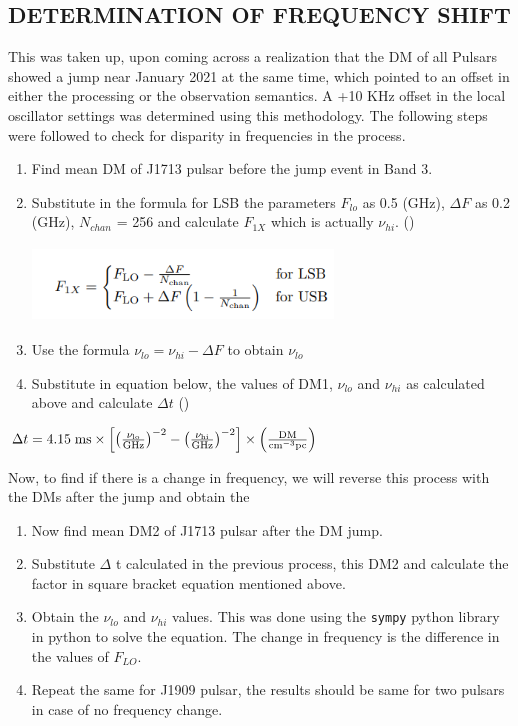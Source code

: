 \documentclass{article}
\begin{document}
\clearpage
\newpage
\subsection{DETERMINATION OF FREQUENCY SHIFT}
 This was taken up, upon coming across a realization that the DM of all Pulsars showed a jump near January 2021 at the same time, which pointed to an offset in either the processing or the observation semantics. A +10 KHz offset in the local oscillator settings was determined using this methodology. The following steps were followed to check for disparity in frequencies in the process.
\begin{enumerate}
    \item Find mean DM of J1713 pulsar before the jump event in Band 3.
    \item Substitute in the formula for LSB the parameters $F_{lo}$ as 0.5 (GHz),
$\Delta F$ as 0.2 (GHz), $N_{chan}$ = 256 and calculate $F_{1X}$ which is actually $\nu_{hi}$. (\cite{Susobhanan+2021})
\begin{center}
        \includegraphics[height=2cm,width=8cm]{Images/Eqn.png}
\end{center}
    \item Use the formula $\nu_{lo} = \nu_{hi} - \Delta F$ to obtain $\nu_{lo}$
    \item Substitute in equation below, the values of DM1, $\nu_{lo}$ and
$\nu_{hi}$ as calculated above and calculate $\Delta t$ (\cite{10.12942/lrr-2008-8})
\end{enumerate}
\begin{center}
    $\Delta t = 4.15\;{\rm{ms}} \times \left[ {{{\left({{{{\nu _{{\rm{lo}}}}} \over {{\rm{GHz}}}}} \right)}^{- 2}} - {{\left({{{{\nu _{{\rm{hi}}}}} \over {{\rm{GHz}}}}} \right)}^{- 2}}} \right] \times \left({{{{\rm{DM}}} \over {{\rm{c}}{{\rm{m}}^{{\rm{- 3}}}}{\rm{pc}}}}} \right)$
\end{center}
Now, to find if there is a change in frequency, we will reverse this process with the DMs after the jump and obtain the 
\begin{enumerate}
    \item Now find mean DM2 of J1713 pulsar after the DM jump.
    \item Substitute $\Delta$ t calculated in the previous process, this DM2 and calculate
the factor in square bracket equation mentioned above. 
    \item Obtain the $\nu_{lo}$ and $\nu_{hi}$ values. This was done using the {\tt sympy} python library in python to solve the equation. The change in frequency is the difference in the values of $F_{LO}$.
    \item Repeat the same for J1909 pulsar, the results should be same for two pulsars in case of no frequency change.
\end{enumerate}
\end{document}
